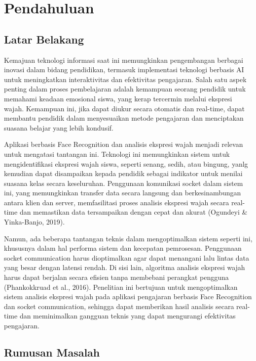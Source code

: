 \chapter{Pendahuluan}
\section{Latar Belakang}
\qquad Kemajuan teknologi informasi saat ini memungkinkan pengembangan berbagai inovasi dalam bidang pendidikan, termasuk implementasi teknologi berbasis AI untuk meningkatkan interaktivitas dan efektivitas pengajaran. Salah satu aspek penting dalam proses pembelajaran adalah kemampuan seorang pendidik untuk memahami keadaan emosional siswa, yang kerap tercermin melalui ekspresi wajah. Kemampuan ini, jika dapat diukur secara otomatis dan real-time, dapat membantu pendidik dalam menyesuaikan metode pengajaran dan menciptakan suasana belajar yang lebih kondusif.

Aplikasi berbasis Face Recognition dan analisis ekspresi wajah menjadi relevan untuk mengatasi tantangan ini. Teknologi ini memungkinkan sistem untuk mengidentifikasi ekspresi wajah siswa, seperti senang, sedih, atau bingung, yanlg kemudian dapat disampaikan kepada pendidik sebagai indikator untuk menilai suasana kelas secara keseluruhan. Penggunaan komunikasi socket dalam sistem ini, yang memungkinkan transfer data secara langsung dan berkesinambungan antara klien dan server, memfasilitasi proses analisis ekspresi wajah secara real-time dan memastikan data tersampaikan dengan cepat dan akurat (Ogundeyi \& Yinka-Banjo, 2019).

Namun, ada beberapa tantangan teknis dalam mengoptimalkan sistem seperti ini, khususnya dalam hal performa sistem dan kecepatan pemrosesan. Penggunaan socket communication harus dioptimalkan agar dapat menangani lalu lintas data yang besar dengan latensi rendah. Di sisi lain, algoritma analisis ekspresi wajah harus dapat berjalan secara efisien tanpa membebani perangkat pengguna (Phankokkruad et al., 2016). Penelitian ini bertujuan untuk mengoptimalkan sistem analisis ekspresi wajah pada aplikasi pengajaran berbasis Face Recognition dan socket communication, sehingga dapat memberikan hasil analisis secara real-time dan meminimalkan gangguan teknis yang dapat mengurangi efektivitas pengajaran.

\section{Rumusan Masalah}

